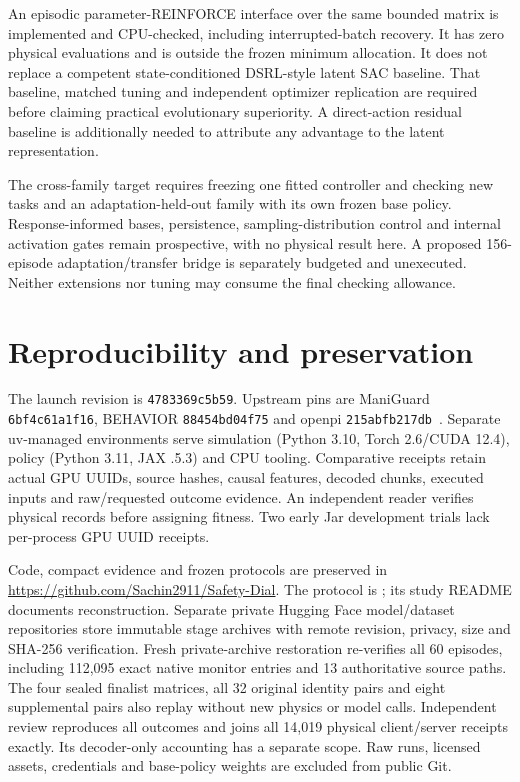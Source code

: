\documentclass[sigconf,dvipsnames,balance=false]{acmart}
\begin{document}
An episodic parameter-REINFORCE interface over the same bounded matrix is implemented
and CPU-checked, including interrupted-batch recovery. It has zero physical
evaluations and is outside the frozen minimum allocation. It does not replace a
competent state-conditioned DSRL-style latent SAC baseline. That baseline, matched
tuning and independent optimizer replication are required before claiming practical
evolutionary superiority. A direct-action residual baseline is additionally needed
to attribute any advantage to the latent representation.

The cross-family target requires freezing one fitted controller and checking new
tasks and an adaptation-held-out family with its own frozen base policy.
Response-informed bases, persistence, sampling-distribution control and internal
activation gates remain prospective, with no physical result here. A proposed
156-episode adaptation/transfer bridge is separately budgeted and unexecuted.
Neither extensions nor tuning may consume the final checking allowance.

\section{Reproducibility and preservation}
The launch revision is \texttt{4783369c5b59}. Upstream pins are ManiGuard
\texttt{6bf4c61a1f16}, BEHAVIOR \texttt{88454bd04f75} and openpi
\texttt{215abfb217db}~\cite{openpi}. Separate uv-managed environments serve
simulation (Python 3.10, Torch 2.6/CUDA 12.4), policy (Python 3.11, JAX .5.3) and
CPU tooling. Comparative receipts retain actual GPU UUIDs, source hashes, causal features,
decoded chunks, executed inputs and raw/requested outcome evidence. An independent
reader verifies physical records before assigning fitness. Two early Jar
development trials lack per-process GPU UUID receipts.

Code, compact evidence and frozen protocols are preserved in
\url{https://github.com/Sachin2911/Safety-Dial}. The protocol is
; its study README
documents reconstruction. Separate private Hugging Face model/dataset repositories
store immutable stage archives with remote revision, privacy, size and SHA-256
verification. Fresh private-archive restoration re-verifies all 60 episodes,
including 112,095 exact native monitor entries and 13 authoritative source paths.
The four sealed finalist matrices, all 32 original identity pairs and eight
supplemental pairs also replay without new physics or model calls. Independent
review reproduces all outcomes and joins all 14,019 physical client/server
receipts exactly. Its decoder-only accounting has a separate scope. Raw runs, licensed assets, credentials
and base-policy weights are excluded from public Git.
\end{document}
